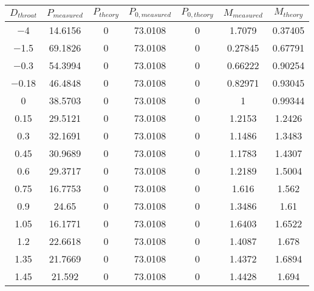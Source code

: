 \begin{tabular}{ccccccc}
\toprule
$D_{throat}$ & $P_{measured}$ & $P_{theory}$ & $P_{0,measured}$ & $P_{0,theory}$ & $M_{measured}$ & $M_{theory}$ \\
\midrule
\num{-4} & \num{14.6156} & \num{0} & \num{73.0108} & \num{0} & \num{1.7079} & \num{0.37405} \\ 
\num{-1.5} & \num{69.1826} & \num{0} & \num{73.0108} & \num{0} & \num{0.27845} & \num{0.67791} \\ 
\num{-0.3} & \num{54.3994} & \num{0} & \num{73.0108} & \num{0} & \num{0.66222} & \num{0.90254} \\ 
\num{-0.18} & \num{46.4848} & \num{0} & \num{73.0108} & \num{0} & \num{0.82971} & \num{0.93045} \\ 
\num{0} & \num{38.5703} & \num{0} & \num{73.0108} & \num{0} & \num{1} & \num{0.99344} \\ 
\num{0.15} & \num{29.5121} & \num{0} & \num{73.0108} & \num{0} & \num{1.2153} & \num{1.2426} \\ 
\num{0.3} & \num{32.1691} & \num{0} & \num{73.0108} & \num{0} & \num{1.1486} & \num{1.3483} \\ 
\num{0.45} & \num{30.9689} & \num{0} & \num{73.0108} & \num{0} & \num{1.1783} & \num{1.4307} \\ 
\num{0.6} & \num{29.3717} & \num{0} & \num{73.0108} & \num{0} & \num{1.2189} & \num{1.5004} \\ 
\num{0.75} & \num{16.7753} & \num{0} & \num{73.0108} & \num{0} & \num{1.616} & \num{1.562} \\ 
\num{0.9} & \num{24.65} & \num{0} & \num{73.0108} & \num{0} & \num{1.3486} & \num{1.61} \\ 
\num{1.05} & \num{16.1771} & \num{0} & \num{73.0108} & \num{0} & \num{1.6403} & \num{1.6522} \\ 
\num{1.2} & \num{22.6618} & \num{0} & \num{73.0108} & \num{0} & \num{1.4087} & \num{1.678} \\ 
\num{1.35} & \num{21.7669} & \num{0} & \num{73.0108} & \num{0} & \num{1.4372} & \num{1.6894} \\ 
\num{1.45} & \num{21.592} & \num{0} & \num{73.0108} & \num{0} & \num{1.4428} & \num{1.694} \\ 
\bottomrule
\end{tabular}